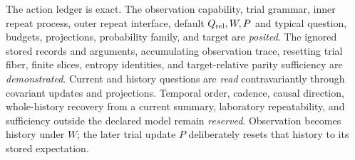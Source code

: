 The action ledger is exact.  The observation capability, trial grammar, inner repeat process, outer repeat interface,
default \(Q_{\rm rel},W,P\) and typical question, budgets,
projections, probability family, and target are \emph{posited}.  The ignored stored records and arguments, accumulating
observation trace, resetting trial fiber, finite slices, entropy identities, and target-relative parity sufficiency are
\emph{demonstrated}.  Current and history questions are \emph{read} contravariantly through covariant updates and
projections.  Temporal order, cadence, causal direction, whole-history recovery from a current summary, laboratory
repeatability, and sufficiency outside the declared model remain \emph{reserved}.  Observation becomes history under
\(W\); the later trial update \(P\) deliberately resets that history to its stored expectation.

